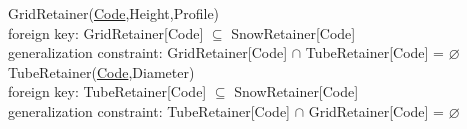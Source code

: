 \documentclass{article}[h]
\begin{document}
{\color{ForestGreen}GridRetainer(\underline{Code},Height,Profile)}\\
{\color{Orange}\hspace{2mm} foreign key: {\color{Magenta}GridRetainer[Code] $\subseteq$ SnowRetainer[Code]}} \\
{\color{Orange}\hspace{2mm} generalization constraint: {\color{Magenta} GridRetainer[Code] $\cap $ TubeRetainer[Code] = $\varnothing$ }} \\ 

{\color{ForestGreen}TubeRetainer(\underline{Code},Diameter)}\\
{\color{Orange}\hspace{2mm} foreign key: {\color{Magenta}TubeRetainer[Code] $\subseteq$ SnowRetainer[Code]}} \\
{\color{Orange}\hspace{2mm} generalization constraint: {\color{Magenta} TubeRetainer[Code]  $\cap $ GridRetainer[Code]  = $\varnothing$ }} \\ 
\end{document}
